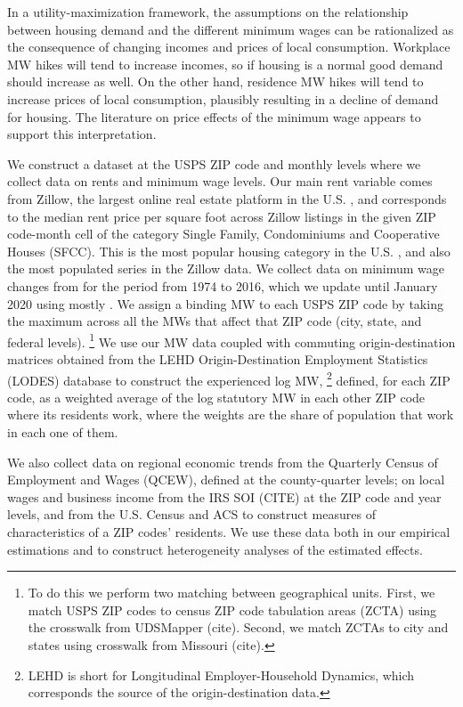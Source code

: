 In a utility-maximization framework, the assumptions on the relationship between
housing demand and the different minimum wages can be rationalized as the consequence
of changing incomes and prices of local consumption.
Workplace MW hikes will tend to increase incomes, so if housing is a normal good 
demand should increase as well.
On the other hand, residence MW hikes will tend to increase prices of local consumption,
plausibly resulting in a decline of demand for housing.
The literature on price effects of the minimum wage appears to support this interpretation.


We construct a dataset at the USPS ZIP code and monthly levels where we collect
data on rents and minimum wage levels.
Our main rent variable comes from Zillow, the largest online real estate platform 
in the U.S. \parencite{realestateagentpdx, investopedia}, and corresponds to the 
median rent price per square foot across Zillow listings in the given ZIP code-month 
cell of the category Single Family, Condominiums and Cooperative Houses (SFCC).
This is the most popular housing category in the U.S. \parencite{fernald2020americas}, 
and also the most populated series in the Zillow data.
We collect data on minimum wage changes from \textcite{VaghulZipperer2016} for the 
period from 1974 to 2016, which we update until January 2020 using mostly
\textcite{BerkeleyLaborCenter}.
We assign a binding MW to each USPS ZIP code by taking the maximum across all the
MWs that affect that ZIP code (city, state, and federal levels).%
\footnote{To do this we perform two matching between geographical units.
First, we match USPS ZIP codes to census ZIP code tabulation areas (ZCTA) using 
the crosswalk from UDSMapper (cite).
Second, we match ZCTAs to city and states using crosswalk from Missouri (cite).}
We use our MW data coupled with commuting origin-destination matrices obtained from 
the LEHD Origin-Destination Employment Statistics (LODES) database to construct the 
experienced log MW,%
\footnote{LEHD is short for Longitudinal Employer-Household Dynamics, which 
corresponds the source of the origin-destination data.}
defined, for each ZIP code, as a weighted average of the log statutory MW in each 
other ZIP code where its residents work, where the weights are the share of population 
that work in each one of them.

We also collect data 
on regional economic trends from the Quarterly Census of Employment and Wages (QCEW),
defined at the county-quarter levels; 
on local wages and business income from the IRS SOI (CITE) at the ZIP code and 
year levels,
and from the U.S. Census and ACS to construct measures of characteristics of a ZIP 
codes' residents.
We use these data both in our empirical estimations and to construct heterogeneity
analyses of the estimated effects.

